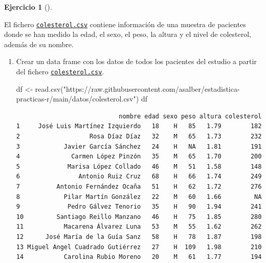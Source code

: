 \documentclass[
  a4paper,
]{scrreport}
\newenvironment{Shaded}{\begin{snugshade}}{\end{snugshade}}
\newcommand{\FunctionTok}[1]{\textcolor[rgb]{0.28,0.35,0.67}{#1}}
\newcommand{\NormalTok}[1]{\textcolor[rgb]{0.00,0.23,0.31}{#1}}
\newcommand{\OtherTok}[1]{\textcolor[rgb]{0.00,0.23,0.31}{#1}}
\newcommand{\StringTok}[1]{\textcolor[rgb]{0.13,0.47,0.30}{#1}}
\theoremstyle{definition}
\newtheorem{exercise}{Ejercicio}[chapter]
\theoremstyle{remark}
\begin{document}
\begin{exercise}[]\protect\hypertarget{exr-descriptiva-2}{}\label{exr-descriptiva-2}

El fichero \href{datos/colesterol.csv}{\texttt{colesterol.csv}} contiene
información de una muestra de pacientes donde se han medido la edad, el
sexo, el peso, la altura y el nivel de colesterol, además de su nombre.

\begin{enumerate}
\def\labelenumi{\alph{enumi}.}
\item
  Crear un data frame con los datos de todos los pacientes del estudio a
  partir del fichero
  \href{datos/colesterol.csv}{\texttt{colesterol.csv}}.

  \begin{tcolorbox}[enhanced jigsaw, coltitle=black, left=2mm, colback=white, leftrule=.75mm, toptitle=1mm, breakable, bottomrule=.15mm, titlerule=0mm, bottomtitle=1mm, title=\textcolor{quarto-callout-tip-color}{\faLightbulb}\hspace{0.5em}{Solución}, arc=.35mm, toprule=.15mm, rightrule=.15mm, colframe=quarto-callout-tip-color-frame, opacityback=0, colbacktitle=quarto-callout-tip-color!10!white, opacitybacktitle=0.6]

\begin{Shaded}
\begin{Highlighting}[]
\NormalTok{df }\OtherTok{\textless{}{-}} \FunctionTok{read.csv}\NormalTok{(}\StringTok{"https://raw.githubusercontent.com/asalber/estadistica{-}practicas{-}r/main/datos/colesterol.csv"}\NormalTok{)}
\NormalTok{df}
\end{Highlighting}
\end{Shaded}

\begin{verbatim}
                            nombre edad sexo peso altura colesterol
1     José Luis Martínez Izquierdo   18    H   85   1.79        182
2                   Rosa Díaz Díaz   32    M   65   1.73        232
3            Javier García Sánchez   24    H   NA   1.81        191
4              Carmen López Pinzón   35    M   65   1.70        200
5             Marisa López Collado   46    M   51   1.58        148
6                Antonio Ruiz Cruz   68    H   66   1.74        249
7          Antonio Fernández Ocaña   51    H   62   1.72        276
8            Pilar Martín González   22    M   60   1.66         NA
9             Pedro Gálvez Tenorio   35    H   90   1.94        241
10         Santiago Reillo Manzano   46    H   75   1.85        280
11           Macarena Álvarez Luna   53    M   55   1.62        262
12      José María de la Guía Sanz   58    H   78   1.87        198
13 Miguel Angel Cuadrado Gutiérrez   27    H  109   1.98        210
14           Carolina Rubio Moreno   20    M   61   1.77        194
\end{verbatim}


\end{tcolorbox}
\end{enumerate}
\end{exercise}
\end{document}
